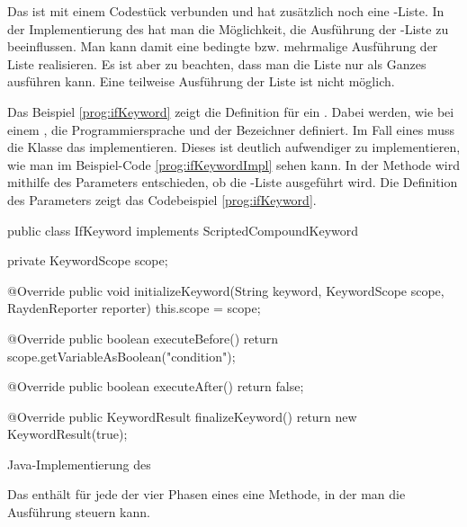 \SuperPar
Das  ist mit einem Codestück verbunden und hat zusätzlich noch eine -Liste. In der Implementierung des  hat man die Möglichkeit, die Ausführung der -Liste zu beeinflussen. Man kann damit eine bedingte bzw. mehrmalige Ausführung der Liste realisieren. Es ist aber zu beachten, dass man die Liste nur als Ganzes ausführen kann. Eine teilweise Ausführung der Liste ist nicht möglich.

\SuperPar
Das Beispiel \ref{prog:ifKeyword} zeigt die Definition für ein . Dabei werden, wie bei einem , die Programmiersprache und der Bezeichner definiert. Im Fall eines  muss die Klasse das   implementieren. Dieses  ist deutlich aufwendiger zu implementieren, wie man im Beispiel-Code \ref{prog:ifKeywordImpl} sehen kann. In der Methode  wird mithilfe des Parameters  entschieden, ob die -Liste ausgeführt wird. Die Definition des Parameters  zeigt das Codebeispiel \ref{prog:ifKeyword}. 

\begin{program}
\begin{JavaCode}
public class IfKeyword implements ScriptedCompoundKeyword {

  private KeywordScope scope;

  @Override
  public void initializeKeyword(String keyword, 
	  KeywordScope scope, RaydenReporter reporter) {
    this.scope = scope;
  }

  @Override
  public boolean executeBefore() {
    return scope.getVariableAsBoolean("condition");
  }

  @Override
  public boolean executeAfter() {
    return false;
  }
  
  @Override
  public KeywordResult finalizeKeyword() {
    return new KeywordResult(true);
  }
	
}
\end{JavaCode}
\caption{Java-Implementierung des }
\label{prog:ifKeywordImpl}
\end{program}

\SuperPar
Das  enthält für jede der vier Phasen eines  eine Methode, in der man die Ausführung steuern kann. \\

